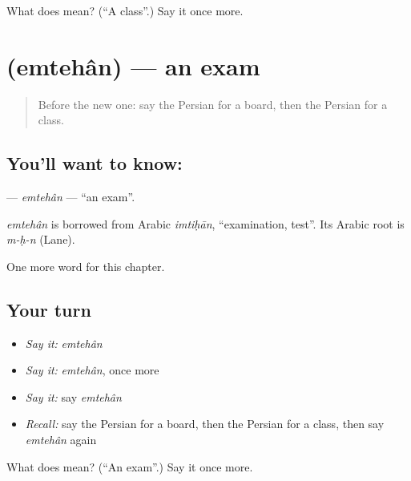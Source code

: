 \begin{tcolorbox}[breakable,colback=teal!4,colframe=teal!35!black,title={Before you move on}]
What does  mean? (\textquotedblleft{}A class\textquotedblright{}.) Say it once more.
\end{tcolorbox}
\section[\texorpdfstring{\fa{امتحان} (emtehân)}{امتحان (emtehân)}]{ (emtehân) — an exam}

\label{lesson:FA-C114-emtehan}



\begin{quote}
Before the new one: say the Persian for a board, then the Persian for a class.
\end{quote}

\subsection*{You'll want to know: }
\textbf{} — \emph{emtehân} — \textquotedblleft{}an exam\textquotedblright{}.

\begin{cousinweb}
\emph{emtehân} is borrowed from Arabic \emph{imtiḥān}, \textquotedblleft{}examination, test\textquotedblright{}. Its Arabic root is \emph{m-ḥ-n} (Lane).
\end{cousinweb}

\begin{grammarlens}[title={What you've built}]
One more word for this chapter.
\end{grammarlens}

\subsection*{Your turn}
\begin{itemize}
\raggedright
  \item \emph{Say it:} \emph{emtehân}
  \item \emph{Say it:} \emph{emtehân}, once more
  \item \emph{Say it:} say \emph{emtehân}
  \item \emph{Recall:} say the Persian for a board, then the Persian for a class, then say \emph{emtehân} again
\end{itemize}

\begin{tcolorbox}[breakable,colback=teal!4,colframe=teal!35!black,title={Before you move on}]
What does  mean? (\textquotedblleft{}An exam\textquotedblright{}.) Say it once more.
\end{tcolorbox}
